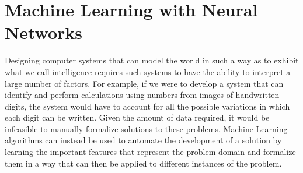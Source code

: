 \section{Machine Learning with Neural Networks} \label{sec:introduction-introduction-machine-learning}

Designing computer systems that can model the world in such a way as to exhibit what we call intelligence requires such systems to have the ability to interpret a large number of factors. For example, if we were to develop a system that can identify and perform calculations using numbers from images of handwritten digits, the system would have to account for all the possible variations in which each digit can be written. Given the amount of data required, it would be infeasible to manually formalize solutions to these problems. Machine Learning algorithms can instead be used to automate the development of a solution by learning the important features that represent the problem domain and formalize them in a way that can then be applied to different instances of the problem\cite{Bengio:2009:LDA:1658423.1658424}.




